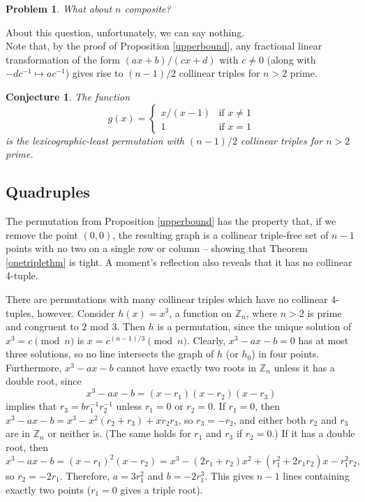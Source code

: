 \documentclass[12pt]{article}
\newtheorem{conjecture}[principle]{Conjecture}
\newtheorem{problem}[principle]{Problem}
\newcommand{\Z}{{\mathbb Z}}
\begin{document}
\begin{problem} What about $n$ composite?
\end{problem}

About this question, unfortunately, we can say nothing.\\

Note that, by the proof of Proposition \ref{upperbound}, any fractional linear transformation of the form $(ax+b)/(cx+d)$ with $c \neq 0$ (along with $-dc^{-1} \mapsto ac^{-1}$) gives rise to $(n-1)/2$ collinear triples for $n > 2$ prime.

\begin{conjecture} The function
$$
g(x) = \left \{ \begin{array}{ll} x/(x-1) & \textrm{if $x \neq 1$} \\ 1 & \textrm{if $x = 1$} \end{array} \right .
$$
is the lexicographic-least permutation with $(n-1)/2$ collinear triples for $n>2$ prime.
\end{conjecture}

\subsection{Quadruples}

The permutation from Proposition \ref{upperbound} has the property that, if we remove the point $(0,0)$, the resulting graph is a collinear triple-free set of $n-1$ points with no two on a single row or column -- showing that Theorem \ref{onetriplethm} is tight.  A moment's reflection also reveals that it has no collinear 4-tuple.

There are permutations with many collinear triples which have no collinear 4-tuples, however.  Consider $h(x) = x^3$, a function on $\Z_n$, where $n > 2$ is prime and congruent to $2$ mod $3$.  Then $h$ is a permutation, since the unique solution of $x^3=c \pmod{n}$ is $x=c^{(n-1)/3} \pmod{n}$.  Clearly, $x^3-ax-b=0$ has at most three solutions, so no line intersects the graph of $h$ (or $h_0$) in four points.  Furthermore, $x^3-ax-b$ cannot have exactly two roots in $\Z_n$ unless it has a double root, since
$$
x^3 - ax - b = (x-r_1)(x-r_2)(x-r_3)
$$
implies that $r_3 = br_1^{-1}r_2^{-1}$ unless $r_1 = 0$ or $r_2 = 0$.  If $r_1 = 0$, then $x^3-ax-b = x^3 - x^2 (r_2+r_3) + x r_2r_3$, so $r_3 = -r_2$, and either both $r_2$ and $r_3$ are in $\Z_n$ or neither is.  (The same holds for $r_1$ and $r_3$ if $r_2 = 0$.)  If it has a double root, then
$$
x^3 - ax - b = (x-r_1)^2(x-r_2) = x^3 - (2r_1+r_2)x^2+(r_1^2+2r_1r_2)x-r_1^2r_2,
$$
so $r_2 = -2r_1$.  Therefore, $a = 3r_1^2$ and $b = -2r_1^3$.  This gives $n-1$ lines containing exactly two points ($r_1 = 0$ gives a triple root).
\end{document}
